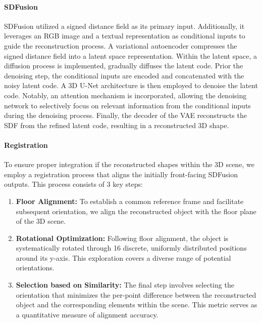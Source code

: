 \paragraph{SDFusion}
SDFusion \cite{cheng2023sdfusion} utilized a signed distance field as its primary input. Additionally, it leverages an RGB image and a textual representation as conditional inputs to guide the reconstruction process.
A variational autoencoder compresses the signed distance field into a latent space representation. Within the latent space, a diffusion process is implemented, gradually diffuses the latent code. Prior the denoising step, the conditional inputs are encoded and concatenated with the noisy latent code.
A 3D U-Net architecture is then employed to denoise the latent code. Notably, an attention mechanism is incorporated, allowing the denoising network to selectively focus on relevant information from the conditional inputs during the denoising process. Finally, the decoder of the VAE reconstructs the SDF from the refined latent code, resulting in a reconstructed 3D shape.

\paragraph{Registration}
To ensure proper integration if the reconstructed shapes within the 3D scene, we employ a registration process that aligns the initially front-facing SDFusion outputs. This process consists of 3 key steps:
\begin{enumerate}
    \item \textbf{Floor Alignment:} To establish a common reference frame and facilitate subsequent orientation, we align the reconstructed object with the floor plane of the 3D scene.
    
    \item \textbf{Rotational Optimization:} Following floor alignment, the object is systematically rotated through 16 discrete, uniformly distributed positions around its y-axis. This exploration covers a diverse range of potential orientations.
    
    \item \textbf{Selection based on Similarity:} The final step involves selecting the orientation that minimizes the per-point difference between the reconstructed object and the corresponding elements within the scene. This metric serves as a quantitative measure of alignment accuracy.
\end{enumerate}
